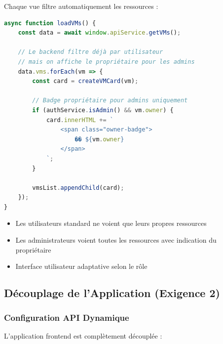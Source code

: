 \documentclass[12pt,a4paper]{article}
\begin{document}
Chaque vue filtre automatiquement les ressources :

\begin{lstlisting}[language=JavaScript,caption=Filtrage côté frontend (vms.js)]
async function loadVMs() {
    const data = await window.apiService.getVMs();
    
    // Le backend filtre déjà par utilisateur
    // mais on affiche le propriétaire pour les admins
    data.vms.forEach(vm => {
        const card = createVMCard(vm);
        
        // Badge propriétaire pour admins uniquement
        if (authService.isAdmin() && vm.owner) {
            card.innerHTML += `
                <span class="owner-badge">
                    �� ${vm.owner}
                </span>
            `;
        }
        
        vmsList.appendChild(card);
    });
}
\end{lstlisting}

\begin{successbox}[Résultat]
\begin{itemize}
    \item Les utilisateurs standard ne voient que leurs propres ressources
    \item Les administrateurs voient toutes les ressources avec indication du propriétaire
    \item Interface utilisateur adaptative selon le rôle
\end{itemize}
\end{successbox}

\subsection{Découplage de l'Application (Exigence 2)}

\subsubsection{Configuration API Dynamique}

L'application frontend est complètement découplée :
\end{document}
